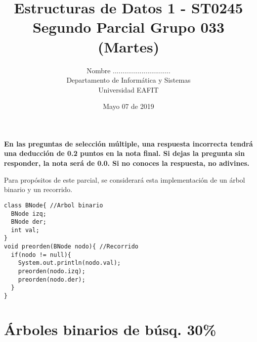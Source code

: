 \documentclass[10 pt]{article}
\title{\textbf {Estructuras de Datos 1 - ST0245\\Segundo Parcial Grupo 033 (Martes)}}
\author{Nombre ..............................\\
		Departamento de Informática y Sistemas\\
		Universidad EAFIT\\}
\date{Mayo 07 de 2019}
\begin{document}
\lstset{escapechar=@,style=customc, numbers=left, stepnumber = 1} 
\maketitle
\textbf{En las preguntas de selección múltiple, una respuesta incorrecta tendrá
una deducción de 0.2 puntos en la nota final. Si dejas la pregunta sin
responder, la nota será de 0.0. Si no conoces la respuesta, no adivines.}

\begin{multicols}{2}
Para propósitos de este parcial, se considerará esta implementación de un árbol binario y un recorrido.
{\footnotesize
\begin{lstlisting}
class BNode{ //Arbol binario
  BNode izq;
  BNode der;
  int val;
}
void preorden(BNode nodo){ //Recorrido
  if(nodo != null){
    System.out.println(nodo.val);
    preorden(nodo.izq);
    preorden(nodo.der);  
  }
}
\end{lstlisting}
}
	\section{Árboles binarios de búsq. 30\%}
	
	\begin{center}
		\begin{tikzpicture}
		

\end{tikzpicture}
\end{center}
\end{multicols}
\end{document}
